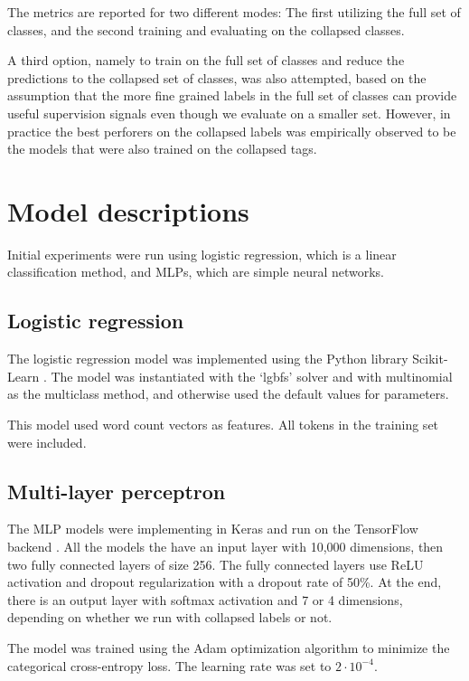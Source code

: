 The metrics are reported for two different modes: The first utilizing the
full set of classes, and the second training and evaluating on the collapsed
classes.

A third option, namely to train on the full set of classes and reduce the
predictions to the collapsed set of classes, was also attempted, based on the
assumption that the more fine grained labels in the full set of classes can
provide useful supervision signals even though we evaluate on a smaller set.
However, in practice the best perforers on the collapsed labels was
empirically observed to be the models that were also trained on the collapsed
tags.


\section{Model descriptions}

Initial experiments were run using logistic regression, which is a linear
classification method, and \acp{MLP}, which are simple neural networks.


\subsection{Logistic regression}

The logistic regression model was implemented using the Python library
Scikit-Learn \autocite{scikit-learn}. The model was instantiated with the
`lgbfs' solver and with multinomial as the multiclass method, and otherwise
used the default values for parameters.

This model used word count vectors as features. All tokens in the training set
were included.


\subsection{Multi-layer perceptron}
\label{subsec:mlp}

The MLP models were implementing in Keras \autocite{keras} and run on the
TensorFlow backend \autocite{tensorflow}. All the models the have an input
layer with 10,000 dimensions, then two fully connected layers of size 256.
The fully connected layers use \ac{ReLU} activation and dropout
regularization with a dropout rate of 50\%. At the end, there is an output
layer with softmax activation and 7 or 4 dimensions, depending on whether we
run with collapsed labels or not.

The model was trained using the Adam optimization algorithm
\autocite{kingma2014adam} to minimize the categorical cross-entropy loss. The
learning rate was set to $2\cdot 10^{-4}$.

